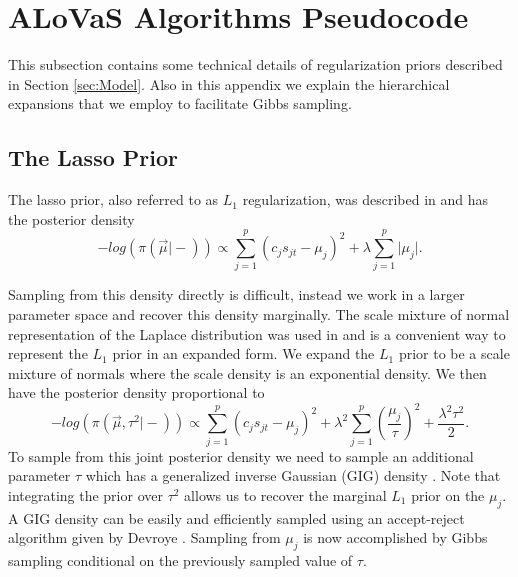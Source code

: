 \section{ALoVaS Algorithms Pseudocode}\label{sec:pseudo}

This subsection contains some technical details of regularization priors described in Section \ref{sec:Model}.
Also in this appendix we explain the hierarchical expansions that we employ to facilitate Gibbs sampling. 

		\subsection{The Lasso Prior}\label{sec:lasso_app}
		The lasso prior, also referred to as $L_1$ regularization, was described in \cite{tibshirani1996regression} and has the posterior density
\begin{equation}\label{eqn:l1_prior}
 -log(\pi(\vec{\mu} \vert -)) \propto \sum_{j=1}^p (c_j s_{jt} -\mu_j)^2 +\lambda\sum_{j=1}^p \vert \mu_j \vert.
 \end{equation} 
 
 Sampling from this density directly is difficult, instead we work in a larger parameter space and recover this density marginally. 	
The scale mixture of normal representation of the Laplace distribution was used in \cite{park2008bayesian} and is a convenient way to represent the $L_1$ prior in an expanded form. 
 We expand the $L_1$ prior to be a scale mixture of normals where the scale density is an exponential density. We then have the posterior density proportional to 
 \begin{equation}%
 -log(\pi(\vec{\mu}, \tau^2 \vert -)) \propto \sum_{j=1}^p (c_js_{jt}-\mu_j)^2 + \lambda^2\sum_{j=1}^p \left(\frac{\mu_j}{\tau}\right)^2 +\frac{\lambda^2\tau^2}{2}.\nonumber
 \end{equation}
To sample from this joint posterior density we need to sample an additional parameter $\tau$ which has a generalized inverse Gaussian (GIG) density \cite{chhikara1989inverse,devroye1986non}. Note that integrating the prior over $\tau^2$ allows us to recover the marginal $L_1$ prior on the $\mu_j$. A GIG density can be easily and efficiently sampled using an accept-reject algorithm given by Devroye \cite{devroye1986non}.  Sampling from $\mu_j$ is now accomplished by Gibbs sampling conditional on the previously sampled value of $\tau$. 

